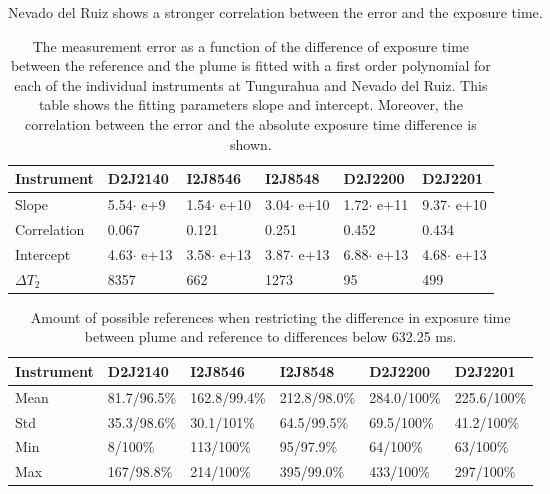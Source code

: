 Nevado del Ruiz shows a stronger correlation between the   error and the exposure time.
\begin{table}[h]
	\centering
	\begin{tabular}{|p{2cm}|p{2cm}|p{2cm}|p{2cm}|p{2cm}|p{2cm}|}
		Instrument	&D2J2140&I2J8546& I2J8548&D2J2200&D2J2201\\
		\toprule
		Slope& 5.54$\cdot$ e+9&1.54$\cdot$ e+10 &3.04$\cdot$ e+10&1.72$\cdot$ e+11&9.37$\cdot$ e+10\\
		\midrule
		Correlation&0.067
		&0.121&
		0.251&
		0.452&
		0.434\\
		\midrule
		Intercept&4.63$\cdot$ e+13&3.58$\cdot$ e+13& 3.87$\cdot$ e+13& 6.88$\cdot$ e+13& 4.68$\cdot$ e+13\\
		\midrule
		$\Delta T_{2}$&8357&662&1273&95&499\\
		\bottomrule
	\end{tabular}
	\caption{The  measurement error as a function of the difference of exposure time between the reference and the plume is fitted with a first order polynomial for each of the individual instruments at Tungurahua and Nevado del Ruiz. This table shows the fitting parameters slope and intercept. Moreover, the correlation between the  error and the absolute exposure time difference is shown.}
	\label{tab:exptimecalc}
\end{table}

\begin{table}
	\centering
	\begin{tabular}{|p{1.8cm}|p{2.15cm}|p{2.15cm}|p{2.15cm}|p{2.15cm}|p{2.15cm}|}
		Instrument	&D2J2140&I2J8546& I2J8548&D2J2200&D2J2201\\
		\toprule
		Mean&
		81.7/96.5\%		&162.8/99.4\%		&212.8/98.0\%		&284.0/100\%		&225.6/100\% \\
		\midrule
		Std&
		35.3/98.6\%&		30.1/101\%&
		64.5/99.5\% &		69.5/100\% &
		41.2/100\% \\
		\midrule
		Min  &
		8/100\%&113/100\%
		&95/97.9\%
		&64/100\%
		&63/100\%\\
		\midrule
		Max&
		167/98.8\% &
		214/100\% &
		395/99.0\% &
		433/100\%  &
		297/100\% \\
		\bottomrule
	\end{tabular}
	\caption{Amount of possible references when restricting the difference in exposure time  between plume and reference to differences below 632.25 ms.}
	\label{tab:etrest}
\end{table}	


